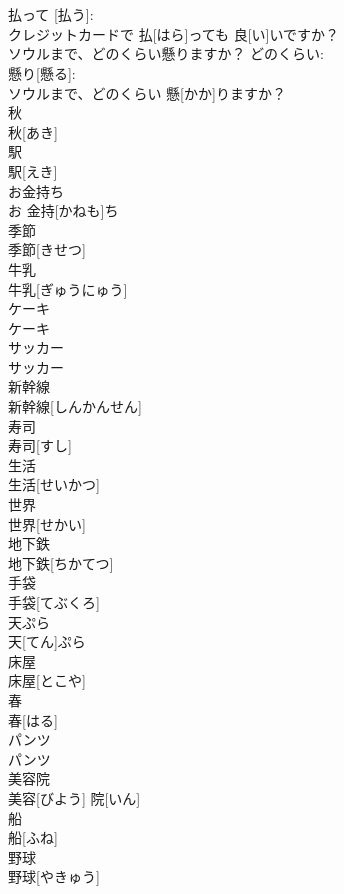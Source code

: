 \documentclass[8pt]{extreport}
\begin{document}
\begin{CJK}{UTF8}{min}
\\	[クレジットカード] 
\\	払って [払う]: 
\\	クレジットカードで 払[はら]っても 良[い]いですか？	
\\	ソウルまで、どのくらい懸りますか？	どのくらい: 
\\	懸り[懸る]: 
\\	ソウルまで、どのくらい 懸[かか]りますか？		
\\	秋	
\\	秋[あき]		
\\	駅	
\\	駅[えき]		
\\	お金持ち	
\\	お 金持[かねも]ち		
\\	季節	
\\	季節[きせつ]		
\\	牛乳	
\\	牛乳[ぎゅうにゅう]		
\\	ケーキ	
\\	ケーキ		
\\	サッカー	
\\	サッカー		
\\	新幹線	
\\	新幹線[しんかんせん]		
\\	寿司	
\\	寿司[すし]		
\\	生活	
\\	生活[せいかつ]		
\\	世界	
\\	世界[せかい]		
\\	地下鉄	
\\	地下鉄[ちかてつ]		
\\	手袋	
\\	手袋[てぶくろ]		
\\	天ぷら	
\\	天[てん]ぷら		
\\	床屋	
\\	床屋[とこや]		
\\	春	
\\	春[はる]		
\\	パンツ	
\\	パンツ		
\\	美容院	
\\	美容[びよう] 院[いん]		
\\	船	
\\	船[ふね]		
\\	野球	
\\	野球[やきゅう]		

\end{CJK}
\end{document}
